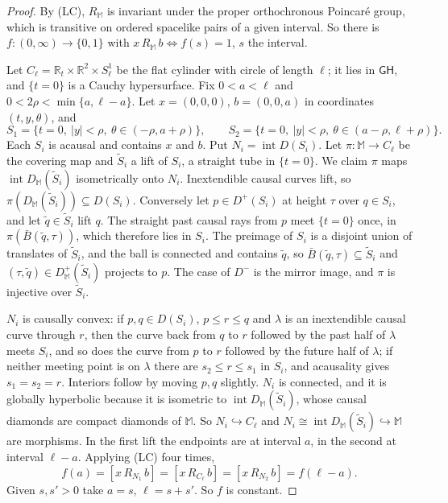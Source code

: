 \documentclass[11pt]{article}
\theoremstyle{definition}
\newcommand{\GH}{\mathsf{GH}}
\newcommand{\Mink}{\mathbb M}
\begin{document}
\begin{proof}
By (LC), $R_\Mink$ is invariant under the proper orthochronous Poincaré group,
which is transitive on ordered spacelike pairs of a given interval. So there is
$f:(0,\infty)\to\{0,1\}$ with $x\,R_\Mink\,b\iff f(s)=1$, $s$ the interval.

Let $C_\ell=\mathbb R_t\times\mathbb R^2\times S^1_\ell$ be the flat cylinder
with circle of length $\ell$; it lies in $\GH$, and $\{t=0\}$ is a Cauchy
hypersurface. Fix $0<a<\ell$ and $0<2\rho<\min\{a,\ell-a\}$. Let $x=(0,0,0)$,
$b=(0,0,a)$ in coordinates $(t,y,\theta)$, and
\[
S_1=\{t=0,\ |y|<\rho,\ \theta\in(-\rho,a+\rho)\},\qquad
S_2=\{t=0,\ |y|<\rho,\ \theta\in(a-\rho,\ell+\rho)\}.
\]
Each $S_i$ is acausal and contains $x$ and $b$. Put $N_i=\operatorname{int}
D(S_i)$. Let $\pi:\Mink\to C_\ell$ be the covering map and $\tilde S_i$ a lift
of $S_i$, a straight tube in $\{t=0\}$. We claim $\pi$ maps
$\operatorname{int}D_\Mink(\tilde S_i)$ isometrically onto $N_i$. Inextendible
causal curves lift, so $\pi(D_\Mink(\tilde S_i))\subseteq D(S_i)$. Conversely
let $p\in D^+(S_i)$ at height $\tau$ over $q\in S_i$, and let $\tilde q\in
\tilde S_i$ lift $q$. The straight past causal rays from $p$ meet $\{t=0\}$
once, in $\pi(\bar B(\tilde q,\tau))$, which therefore lies in $S_i$. The
preimage of $S_i$ is a disjoint union of translates of $\tilde S_i$, and the
ball is connected and contains $\tilde q$, so $\bar B(\tilde q,\tau)\subseteq
\tilde S_i$ and $(\tau,\tilde q)\in D^+_\Mink(\tilde S_i)$ projects to $p$.
The case of $D^-$ is the mirror image, and $\pi$ is injective over $\tilde S_i$.

$N_i$ is causally convex: if $p,q\in D(S_i)$, $p\le r\le q$ and $\lambda$ is an
inextendible causal curve through $r$, then the curve back from $q$ to $r$
followed by the past half of $\lambda$ meets $S_i$, and so does the curve from
$p$ to $r$ followed by the future half of $\lambda$; if neither meeting point
is on $\lambda$ there are $s_2\le r\le s_1$ in $S_i$, and acausality gives
$s_1=s_2=r$. Interiors follow by moving $p,q$ slightly. $N_i$ is connected,
and it is globally hyperbolic because it is isometric to
$\operatorname{int}D_\Mink(\tilde S_i)$, whose causal diamonds are compact
diamonds of $\Mink$. So $N_i\hookrightarrow C_\ell$ and
$N_i\cong\operatorname{int}D_\Mink(\tilde S_i)\hookrightarrow\Mink$ are
morphisms. In the first lift the endpoints are at interval $a$, in the second
at interval $\ell-a$. Applying (LC) four times,
\[
f(a)=[x\,R_{N_1}\,b]=[x\,R_{C_\ell}\,b]=[x\,R_{N_2}\,b]=f(\ell-a).
\]
Given $s,s'>0$ take $a=s$, $\ell=s+s'$. So $f$ is constant.
\end{proof}
\end{document}
